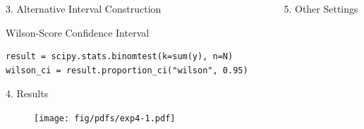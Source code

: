 \documentclass[final]{beamer}
\newlength{\sepwidth}
\newlength{\colwidth}
\newcommand{\separatorcolumn}{\begin{column}{\sepwidth}\end{column}}
\begin{document}
\begin{frame}[fragile]
\begin{columns}[t]
\begin{column}{\colwidth}
\begin{block}{3. Alternative Interval Construction}
    \begin{pbox}[label={ex:wilson_simple}]{Wilson-Score Confidence Interval}
    \begin{verbatim}
result = scipy.stats.binomtest(k=sum(y), n=N)
wilson_ci = result.proportion_ci("wilson", 0.95)
    \end{verbatim}
    \end{pbox}




  
  \end{block}

  \vspace{-1em}

  \begin{block}{4. Results}

    \begin{figure}
      \centering
      \texttt{[image: fig/pdfs/exp4-1.pdf]}
    \end{figure}

  \end{block}

\end{column}

\separatorcolumn

\begin{column}{\colwidth}

  \begin{exampleblock}{5. Other Settings}


\end{exampleblock}
\end{column}
\end{columns}
\end{frame}
\end{document}
